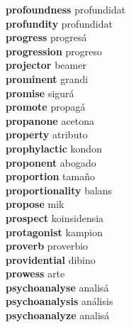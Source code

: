 \textbf{profoundness } profundidat \\
\textbf{profundity } profundidat \\
\textbf{progress } progresá \\
\textbf{progression } progreso \\
\textbf{projector } beamer \\
\textbf{prominent } grandi \\
\textbf{promise } sigurá \\
\textbf{promote } propagá \\
\textbf{propanone } acetona \\
\textbf{property } atributo \\
\textbf{prophylactic } kondon \\
\textbf{proponent } abogado \\
\textbf{proportion } tamaño \\
\textbf{proportionality } balans \\
\textbf{propose } mik \\
\textbf{prospect } koinsidensia \\
\textbf{protagonist } kampion \\
\textbf{proverb } proverbio \\
\textbf{providential } dibino \\
\textbf{prowess } arte \\
\textbf{psychoanalyse } analisá \\
\textbf{psychoanalysis } análisis \\
\textbf{psychoanalyze } analisá \\
